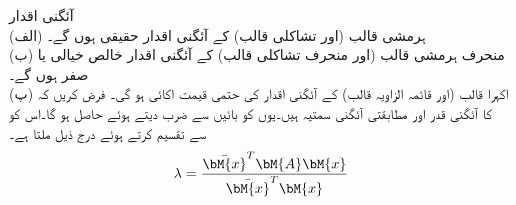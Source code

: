 \quad آئگنی اقدار\\
(الف) ہرمشی قالب (اور تشاکلی قالب) کے آئگنی اقدار حقیقی ہوں گے۔\\
(ب) منحرف ہرمشی قالب (اور منحرف تشاکلی قالب) کے آئگنی اقدار خالص خیالی یا صفر  ہوں گے۔\\
(پ) اکہرا قالب (اور قائمہ الزاویہ قالب) کے آئگنی اقدار کی حتمی قیمت اکائی  ہو گی۔
فرض کریں کہ  کا آئگنی قدر   اور مطابقتی آئگنی سمتیہ   ہیں۔یوں  کو بائیں   سے ضرب دیتے ہوئے  حاصل ہو گا۔اس کو   سے تقسیم کرتے ہوئے درج ذیل ملتا ہے۔
\begin{align}\label{مساوات_آئگنی_مسئلہ_اقدار_الف}
\lambda=\frac{\bar{\bM{x}}^T\bM{A}\bM{x}}{\bar{\bM{x}}^T\bM{x}}
\end{align}


